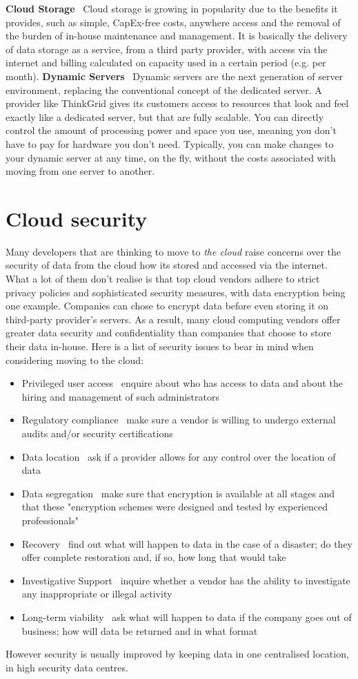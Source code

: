 {\bf Cloud Storage} \textendash\ Cloud storage is growing in popularity due to the benefits it provides, such as simple, CapEx-free costs, 
anywhere access and the removal of the burden of in-house maintenance and management. It is basically the 
delivery of data storage as a service, from a third party provider, with access via the internet and billing 
calculated on capacity used in a certain period (e.g. per month).  
{\bf Dynamic Servers} \textendash\ Dynamic servers are the next generation of server environment, replacing the conventional concept of the 
dedicated server. A provider like ThinkGrid gives its customers access to resources that look and feel exactly 
like a dedicated server, but that are fully scalable. You can directly control the amount of processing power 
and space you use, meaning you don't have to pay for hardware you don't need. Typically, you can make 
changes to your dynamic server at any time, on the fly, without the costs associated with moving from one 
server to another.
\section{Cloud security}
Many developers that are thinking to move to \emph{the cloud} raise concerns over the security of data from the cloud how its stored and 
accessed via the internet. What a lot of them don't realise is that top cloud vendors adhere to strict privacy policies and sophisticated 
security measures, with data encryption being one example.
Companies can chose to encrypt data before even storing it on third-party provider's servers. As a result, many cloud computing vendors offer
greater data security and confidentiality than companies that choose to store their data in-house. 
Here is a list of security issues to bear in mind when considering moving to the cloud: 
\begin{itemize}
 \item Privileged user access \textendash\ enquire about who has access to data and about the hiring and management of such administrators
 \item Regulatory compliance \textendash\ make sure a vendor is willing to undergo external audits and/or security  certifications
 \item Data location \textendash\ ask if a provider allows for any control over the location of data
 \item Data segregation \textendash\ make sure that encryption is available at all stages and that these "encryption schemes were designed 
 and tested by experienced professionals"
 \item Recovery \textendash\ find out what will happen to data in the case of a disaster; do they offer complete restoration and, if so, how 
 long that would take
 \item Investigative Support \textendash\ inquire whether a vendor has the ability to investigate any inappropriate or illegal activity
 \item Long-term viability \textendash\ ask what will happen to data if the company goes out of business; how will data be returned and in what format 
\end{itemize} 
However security is usually improved by keeping data in one centralised location, in high security data centres.